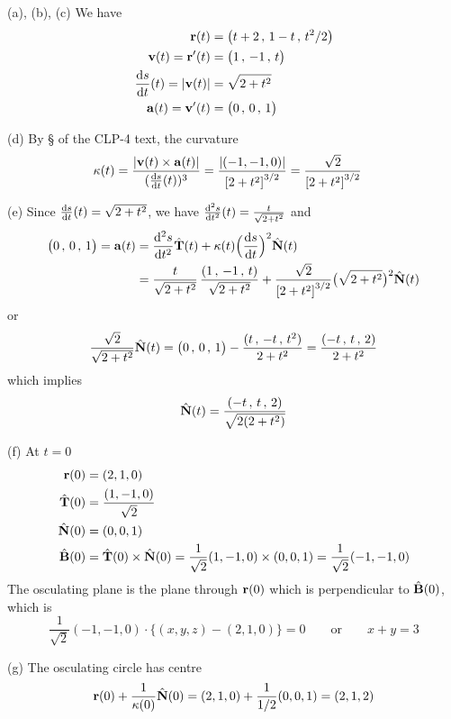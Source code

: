 \begin{solution}  (a), (b), (c)
We have
\begin{align*}
\vr(t) &= \big(t + 2\,,\, 1 - t\,,\, t^2 /2\big) \\
\vv(t) =\vr'(t)&= \big(1\,,\, -1\,,\, t\big) \\
\diff{s}{t}(t)=|\vv(t)|&=\sqrt{2+t^2} \\
\va(t) = \vv'(t)&=\big(0\,,\, 0\,,\, 1\big) 
\end{align*}

(d) By \S{} of the CLP-4 text,
the curvature
\begin{align*}
\ka(t) & = \frac{|\vv(t)\times\va(t)|}{(\diff{s}{t}(t))^3}
= \frac{|(-1,-1,0)|}{{[2+t^2]}^{3/2}}
= \frac{\sqrt{2}}{{[2+t^2]}^{3/2}}
\end{align*}

(e) Since $\diff{s}{t}(t)=\sqrt{2+t^2}$, we have 
$\difftwo{s}{t}(t)=\frac{t}{\sqrt{2+t^2}}$ and
\begin{align*}
\big(0\,,\, 0\,,\, 1\big) 
=\va(t) 
&= \difftwo{s}{t} \hat\vT(t) 
 + \kappa(t)\Big(\diff{s}{t}\Big)^2\hat\vN(t) \\
&=\frac{t}{\sqrt{2+t^2}}\,\frac{(1\,,\, -1\,,\, t)}{\sqrt{2+t^2}} 
  + \frac{\sqrt{2}}{{[2+t^2]}^{3/2}}\big(\sqrt{2+t^2}\big)^2\hat\vN(t)
\end{align*}
or
\begin{align*}
\frac{\sqrt{2}}{\sqrt{2+t^2}}\hat{\mathbf{N}}(t)
=\big(0\,,\, 0\,,\, 1\big)  - \frac{(t\,,\, -t\,,\, t^2)}{2+t^2} 
=\frac{(-t\,,\, t\,,\, 2)}{2+t^2} 
\end{align*}
which implies
\begin{align*}
\hat{\mathbf{N}}(t) = \frac{(-t\,,\, t\,,\, 2)}{\sqrt{2(2+t^2)}}
\end{align*}

(f) At $t=0$
\begin{align*}
\mathbf{r}(0) &= (2,1,0) \\
\hat{\mathbf{T}}(0)&= \frac{(1,-1,0)}{\sqrt{2}} \\
\hat{\mathbf{N}}(0)&= (0,0,1) \\
\hat{\mathbf{B}}(0)&= \hat{\mathbf{T}}(0)\times\hat{\mathbf{N}}(0)
           = \frac{1}{\sqrt{2}}(1,-1,0)\times (0,0,1)
           = \frac{1}{\sqrt{2}}(-1 ,-1, 0)
\end{align*}
The osculating plane is the plane through $\mathbf{r}(0)$ which is perpendicular
to $\hat{\mathbf{B}}(0)$, which is
\begin{equation*}
\frac{1}{\sqrt{2}}(-1 ,-1, 0)\cdot\big\{(x,y,z) - (2,1,0)\big\}=0
\qquad\text{or}\qquad
x+y = 3
\end{equation*}

(g) The osculating circle has centre
\begin{equation*}
\mathbf{r}(0)+\frac{1}{\kappa(0)}\hat{\mathbf{N}}(0)
=(2,1,0) +\frac{1}{1/2} (0,0,1)
=(2,1,2)
\end{equation*}
\end{solution}


